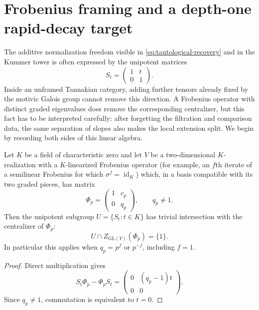 \section{Frobenius framing and a depth-one rapid-decay target}
\label{sec:frobenius-framing}

The additive normalization freedom visible in
\eqref{eq:tautological-recovery} and in the Kummer tower is often expressed
by the unipotent matrices
\[
 S_t=\begin{pmatrix}1&t\\0&1\end{pmatrix}.
\]
Inside an unframed Tannakian category, adding further tensors already fixed
by the motivic Galois group cannot remove this direction.  A Frobenius
operator with distinct graded eigenvalues does remove the corresponding
centralizer, but this fact has to be interpreted carefully: after forgetting
the filtration and comparison data, the same separation of slopes also makes
the local extension split.  We begin by recording both sides of this linear
algebra.

\begin{lemma}
\label{lem:frobenius-framed-rigidity}
Let $K$ be a field of characteristic zero and let $V$ be a two-dimensional
$K$-realization with a $K$-linearized Frobenius operator (for example, an
$f$th iterate of a semilinear Frobenius for which
$\sigma^f=\operatorname{id}_K$) which, in a basis compatible with its two
graded pieces, has matrix
\begin{equation}\label{eq:frobenius-matrix}
 \Phi_p=\begin{pmatrix}1&c_p\\0&q_p\end{pmatrix},
 \qquad q_p\ne1.
\end{equation}
Then the unipotent subgroup $U=\{S_t:t\in K\}$ has trivial intersection
with the centralizer of $\Phi_p$:
\begin{equation}\label{eq:frobenius-centralizer}
 U\cap Z_{\mathrm{GL}(V)}(\Phi_p)=\{1\}.
\end{equation}
In particular this applies when $q_p=p^f$ or $p^{-f}$, including $f=1$.
\end{lemma}

\begin{proof}
Direct multiplication gives
\[
 S_t\Phi_p-\Phi_pS_t
 =\begin{pmatrix}0&(q_p-1)t\\0&0\end{pmatrix}.
\]
Since $q_p\ne1$, commutation is equivalent to $t=0$.
\end{proof}

